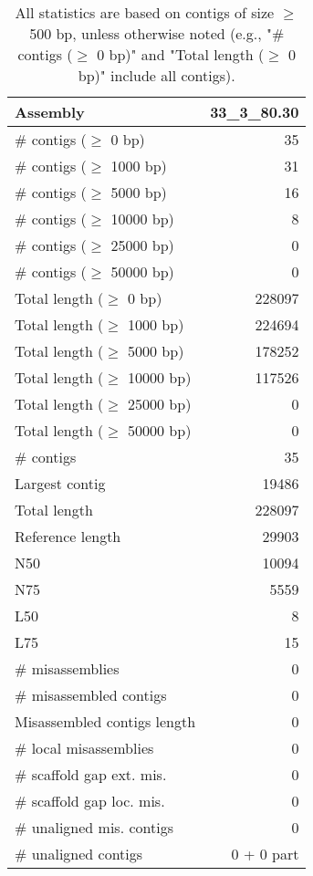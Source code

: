 \documentclass[12pt,a4paper]{article}
\begin{document}
\begin{table}[ht]
\begin{center}
\caption{All statistics are based on contigs of size $\geq$ 500 bp, unless otherwise noted (e.g., "\# contigs ($\geq$ 0 bp)" and "Total length ($\geq$ 0 bp)" include all contigs).}
\begin{tabular}{|l*{1}{|r}|}
\hline
Assembly & 33\_3\_80.30 \\ \hline
\# contigs ($\geq$ 0 bp) & 35 \\ \hline
\# contigs ($\geq$ 1000 bp) & 31 \\ \hline
\# contigs ($\geq$ 5000 bp) & 16 \\ \hline
\# contigs ($\geq$ 10000 bp) & 8 \\ \hline
\# contigs ($\geq$ 25000 bp) & 0 \\ \hline
\# contigs ($\geq$ 50000 bp) & 0 \\ \hline
Total length ($\geq$ 0 bp) & 228097 \\ \hline
Total length ($\geq$ 1000 bp) & 224694 \\ \hline
Total length ($\geq$ 5000 bp) & 178252 \\ \hline
Total length ($\geq$ 10000 bp) & 117526 \\ \hline
Total length ($\geq$ 25000 bp) & 0 \\ \hline
Total length ($\geq$ 50000 bp) & 0 \\ \hline
\# contigs & 35 \\ \hline
Largest contig & 19486 \\ \hline
Total length & 228097 \\ \hline
Reference length & 29903 \\ \hline
N50 & 10094 \\ \hline
N75 & 5559 \\ \hline
L50 & 8 \\ \hline
L75 & 15 \\ \hline
\# misassemblies & 0 \\ \hline
\# misassembled contigs & 0 \\ \hline
Misassembled contigs length & 0 \\ \hline
\# local misassemblies & 0 \\ \hline
\# scaffold gap ext. mis. & 0 \\ \hline
\# scaffold gap loc. mis. & 0 \\ \hline
\# unaligned mis. contigs & 0 \\ \hline
\# unaligned contigs & 0 + 0 part \\ \hline

\end{tabular}
\end{center}
\end{table}
\end{document}
